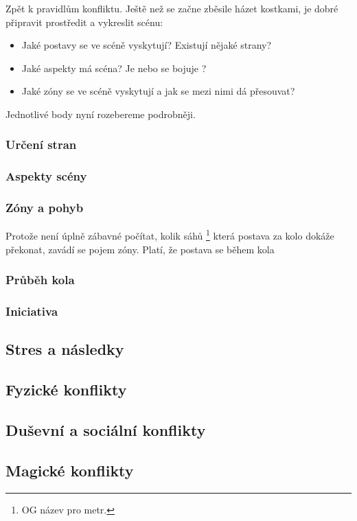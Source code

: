 \documentclass[../main.tex]{subfiles}
\begin{document}
Zpět k pravidlům konfliktu. Ještě než se začne zběsile házet kostkami, je dobré připravit prostředit a vykreslit scénu:

\begin{itemize}
\item Jaké postavy se ve scéně vyskytují? Existují nějaké strany?
\item Jaké aspekty má scéna? Je  nebo se bojuje ?
\item Jaké zóny se ve scéně vyskytují a jak se mezi nimi dá přesouvat?
\end{itemize}

Jednotlivé body nyní rozebereme podrobněji.

\subsubsection{Určení stran}
\label{sec:urcenistran}

\subsubsection{Aspekty scény}
\label{sec:aspektysceny}

\subsubsection{Zóny a pohyb}
\label{sec:zónyapohyb}

Protože není úplně zábavné počítat, kolik sáhů \footnote{OG název pro metr.} která postava za kolo dokáže překonat, zavádí se pojem zóny. Platí, že postava se během kola 

\subsubsection{Průběh kola}
\label{sec:prubehkola}

\subsubsection{Iniciativa}
\label{sec:iniciativa}


\subsection{Stres a následky}
\label{sec:stres-nasledky}

\subsection{Fyzické konflikty}
\label{sec:fyzicke-konflikty}

\subsection{Duševní a sociální konflikty}
\label{sec:dusevni-soc-konflikty}

\subsection{Magické konflikty}
\label{sec:magicke-konflikty}
\end{document}
